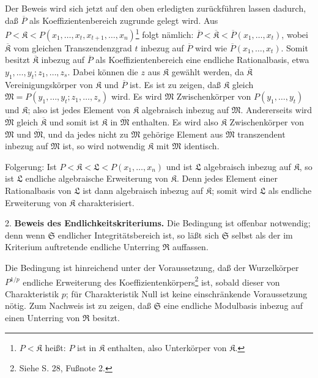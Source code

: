 \documentclass[11pt]{article}
\begin{document}
Der Beweis wird sich jetzt auf den oben erledigten zurückführen lassen dadurch, daß $\overline P$ als Koeffizientenbereich zugrunde gelegt wird. Aus $P<\mathfrak K< P(x_1,\ldots,x_t,x_{t+1},\ldots,x_n)$\footnote{$P<\mathfrak K$ heißt: $P$ ist in $\mathfrak K$ enthalten, also Unterkörper von $\mathfrak K$.} folgt nämlich: $\overline P<\overline{\mathfrak K}<\overline P(x_1,\ldots,x_t)$, wobei $\overline{\mathfrak K}$ vom gleichen Transzendenzgrad $t$ inbezug auf $\overline P$ wird wie $\overline P(x_1,\ldots,x_t)$. Somit besitzt $\overline{\mathfrak K}$ inbezug auf $\overline P$ als Koeffizientenbereich eine endliche Rationalbasis, etwa $y_1,\ldots,y_t; z_1,\ldots,z_s$. Dabei können die $z$ aus $\mathfrak K$ gewählt werden, da $\overline{\mathfrak K}$ Vereinigungskörper von $\mathfrak K$ und $\overline P$ ist. Es ist zu zeigen, daß $\mathfrak K$ gleich $\mathfrak M=P(y_1,\ldots,y_t;z_1,\ldots,z_s)$ wird. Es wird $\mathfrak M$ Zwischenkörper von $P(y_1,\ldots,y_t)$ und $\mathfrak K$; also ist jedes Element von $\mathfrak K$ algebraisch inbezug auf $\mathfrak M$. Andererseits wird $\overline{\mathfrak M}$ gleich $\overline{\mathfrak K}$ und somit ist $\mathfrak K$ in $\overline{\mathfrak M}$ enthalten. Es wird also $\mathfrak K$ Zwischenkörper von $\mathfrak M$ und $\overline{\mathfrak M}$, und da jedes nicht zu $\mathfrak M$ gehörige Element aus $\overline{\mathfrak M}$ transzendent inbezug auf $\mathfrak M$ ist, so wird notwendig $\mathfrak K$ mit $\mathfrak M$ identisch.

Folgerung: Ist $P<\mathfrak K<\mathfrak L<P(x_1,\ldots,x_n)$ und ist $\mathfrak L$ algebraisch inbezug auf $\mathfrak K$, so ist $\mathfrak L$ endliche algebraische Erweiterung von $\mathfrak K$. Denn jedes Element einer Rationalbasis von $\mathfrak L$ ist dann algebraisch inbezug auf $\mathfrak K$; somit wird $\mathfrak L$ als endliche Erweiterung von $\mathfrak K$ charakterisiert.

2. \textbf{Beweis des Endlichkeitskriteriums.} Die Bedingung ist offenbar notwendig; denn wenn $\mathfrak S$ endlicher Integritätsbereich ist, so läßt sich $\mathfrak S$ selbst als der im Kriterium auftretende endliche Unterring $\mathfrak R$ auffassen.

Die Bedingung ist hinreichend unter der Voraussetzung, daß der Wurzelkörper $P^{1/p}$ endliche Erweiterung des Koeffizientenkörpers\footnote{Siehe S. 28, Fußnote 2.} ist, sobald dieser von Charakteristik $p$; für Charakteristik Null ist keine einschränkende Voraussetzung nötig. Zum Nachweis ist zu zeigen, daß $\mathfrak S$ eine endliche Modulbasis inbezug auf einen Unterring von $\mathfrak R$ besitzt.
\end{document}
